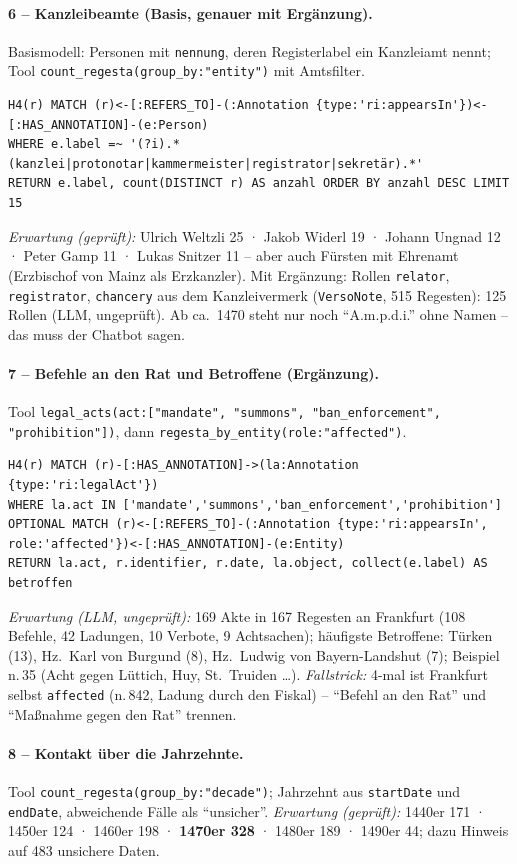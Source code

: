 \documentclass[10pt,a4paper]{article}
\newcommand{\code}[1]{\texttt{\small #1}}
\newcommand{\erg}{\textbf{Ergänzung}}
\begin{document}
\paragraph{6 -- Kanzleibeamte (Basis, genauer mit \erg).}
Basismodell: Personen mit \code{nennung}, deren Registerlabel ein Kanzleiamt nennt; Tool \code{count\_regesta(group\_by:"entity")} mit Amtsfilter.
\begin{lstlisting}
H4(r) MATCH (r)<-[:REFERS_TO]-(:Annotation {type:'ri:appearsIn'})<-[:HAS_ANNOTATION]-(e:Person)
WHERE e.label =~ '(?i).*(kanzlei|protonotar|kammermeister|registrator|sekretär).*'
RETURN e.label, count(DISTINCT r) AS anzahl ORDER BY anzahl DESC LIMIT 15
\end{lstlisting}
\emph{Erwartung (geprüft):} Ulrich Weltzli 25 · Jakob Widerl 19 · Johann Ungnad 12 · Peter Gamp 11 · Lukas Snitzer 11 -- aber auch Fürsten mit Ehrenamt (Erzbischof von Mainz als Erzkanzler).
Mit Ergänzung: Rollen \code{relator}, \code{registrator}, \code{chancery} aus dem Kanzleivermerk (\code{VersoNote}, 515 Regesten): 125 Rollen (LLM, ungeprüft). Ab ca.\ 1470 steht nur noch \enquote{A.m.p.d.i.} ohne Namen -- das muss der Chatbot sagen.

\paragraph{7 -- Befehle an den Rat und Betroffene (\erg).}
Tool \code{legal\_acts(act:[\allowbreak"mandate", "summons", "ban\_enforcement", "prohibition"])}, dann \code{regesta\_by\_entity(role:"affected")}.
\begin{lstlisting}
H4(r) MATCH (r)-[:HAS_ANNOTATION]->(la:Annotation {type:'ri:legalAct'})
WHERE la.act IN ['mandate','summons','ban_enforcement','prohibition']
OPTIONAL MATCH (r)<-[:REFERS_TO]-(:Annotation {type:'ri:appearsIn', role:'affected'})<-[:HAS_ANNOTATION]-(e:Entity)
RETURN la.act, r.identifier, r.date, la.object, collect(e.label) AS betroffen
\end{lstlisting}
\emph{Erwartung (LLM, ungeprüft):} 169 Akte in 167 Regesten an Frankfurt (108 Befehle, 42 Ladungen, 10 Verbote, 9 Achtsachen); häufigste Betroffene: Türken (13), Hz.\ Karl von Burgund (8), Hz.\ Ludwig von Bayern-Landshut (7); Beispiel n.\,35 (Acht gegen Lüttich, Huy, St.\ Truiden \dots).
\emph{Fallstrick:} 4-mal ist Frankfurt selbst \code{affected} (n.\,842, Ladung durch den Fiskal) -- \enquote{Befehl an den Rat} und \enquote{Maßnahme gegen den Rat} trennen.

\paragraph{8 -- Kontakt über die Jahrzehnte.}
Tool \code{count\_regesta(group\_by:"decade")}; Jahrzehnt aus \code{startDate} und \code{endDate}, abweichende Fälle als \enquote{unsicher}.
\emph{Erwartung (geprüft):} 1440er 171 · 1450er 124 · 1460er 198 · \textbf{1470er 328} · 1480er 189 · 1490er 44; dazu Hinweis auf 483 unsichere Daten.
\end{document}
